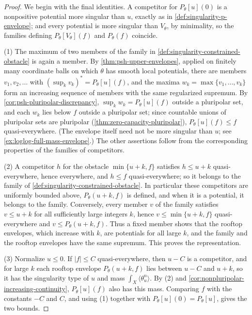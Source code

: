 \begin{proof}
We begin with the final identities. A competitor for $P_\theta[u](0)$ is a nonpositive potential more singular than $u$, exactly as in \cref{def:singularity-p-envelope}; and every potential is more singular than $V_\theta$, by minimality, so the families defining $P_\theta[V_\theta](f)$ and $P_\theta(f)$ coincide.

(1) The maximum of two members of the family in \cref{def:singularity-constrained-obstacle} is again a member. By \cref{thm:psh-upper-envelopes}, applied on finitely many coordinate balls on which $\theta$ has smooth local potentials, there are members $v_1,v_2,\ldots$ with $(\sup_kv_k)^*=P_\theta[u](f)$, and the maxima $w_k=\max\{v_1,\ldots,v_k\}$ form an increasing sequence of members with the same regularized supremum. By \cref{cor:psh-pluripolar-discrepancy}, $\sup_kw_k=P_\theta[u](f)$ outside a pluripolar set, and each $w_k$ lies below $f$ outside a pluripolar set; since countable unions of pluripolar sets are pluripolar (\cref{thm:zero-capacity-pluripolar}), $P_\theta[u](f)\leq f$ quasi-everywhere. (The envelope itself need not be more singular than $u$; see \cref{ex:loglog-full-mass-envelope}.) The other assertions follow from the corresponding properties of the families of competitors.

(2) A competitor $h$ for the obstacle $\min\{u+k,f\}$ satisfies $h\leq u+k$ quasi-everywhere, hence everywhere, and $h\leq f$ quasi-everywhere; so it belongs to the family of \cref{def:singularity-constrained-obstacle}. In particular these competitors are uniformly bounded above, $P_\theta(u+k,f)$ is defined, and when it is a potential, it belongs to the family. Conversely, every member $v$ of the family satisfies $v\leq u+k$ for all sufficiently large integers $k$, hence $v\leq\min\{u+k,f\}$ quasi-everywhere and $v\leq P_\theta(u+k,f)$. Thus a fixed member shows that the rooftop envelopes, which increase with $k$, are potentials for all large $k$, and the family and the rooftop envelopes have the same supremum. This proves the representation.

(3) Normalize $u\leq0$. If $|f|\leq C$ quasi-everywhere, then $u-C$ is a competitor, and for large $k$ each rooftop envelope $P_\theta(u+k,f)$ lies between $u-C$ and $u+k$, so it has the singularity type of $u$ and mass $\int_X\langle\theta_u^n\rangle$. By (2) and \cref{cor:nonpluripolar-increasing-continuity}, $P_\theta[u](f)$ also has this mass. Comparing $f$ with the constants $-C$ and $C$, and using (1) together with $P_\theta[u](0)=P_\theta[u]$, gives the two bounds.
\end{proof}

